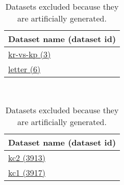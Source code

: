 \documentclass[twoside,11pt]{article}
\begin{document}
\begin{table}[h]
\setlength{\tabcolsep}{2pt}
\caption{Datasets excluded because they are artificially generated.}
\label{tab:dataset:artificial}
\centering
\begin{tabular}{l}
\toprule
\textbf{ Dataset name (dataset id) } \\
\midrule
	\href{https://www.openml.org/d/3}{kr-vs-kp (3)} \\ 
	\href{https://www.openml.org/d/6}{letter  (6)} \\ 
   
\bottomrule
\end{tabular}
~~~~~
\begin{tabular}{l}
\toprule
\textbf{ Dataset name (dataset id) } \\
\midrule 
	\href{https://www.openml.org/d/3913}{kc2 (3913)} \\ 
	\href{https://www.openml.org/d/3917}{kc1 (3917)} \\ 
 
\bottomrule
\end{tabular}
\end{table}
\end{document}
